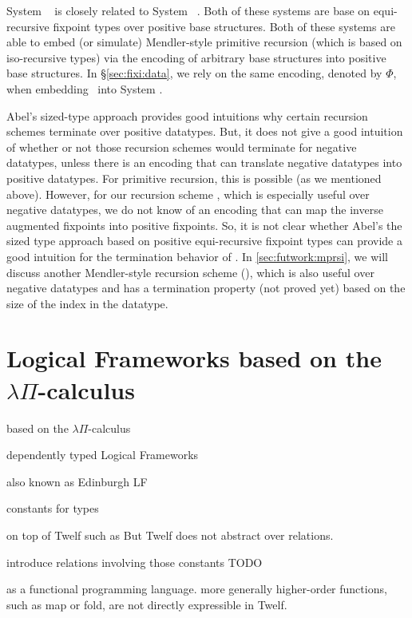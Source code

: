 System \Fwhat\ \cite{abel06phd} is closely related to
System \Fixw\ \cite{AbeMat04}. Both of these systems are base on
equi-recursive fixpoint types over positive base structures.
Both of these systems are able to embed (or simulate) Mendler-style
primitive recursion (which is based on iso-recursive types) via
the encoding \cite{Geu92} of arbitrary base structures into
positive base structures. In \S\ref{sec:fixi:data}, we rely on
the same encoding, denoted by $\Phi$, when embedding \MPr\ into System \Fixi.

Abel's sized-type approach provides good intuitions why 
certain recursion schemes terminate over positive datatypes.
But, it does not give a good intuition of whether or not
those recursion schemes would terminate for negative datatypes,
unless there is an encoding that can translate negative datatypes into
positive datatypes. For primitive recursion, this is possible (as we
mentioned above). However, for our recursion scheme \MsfIt, which is
especially useful over negative datatypes, we do not know of an encoding
that can map the inverse augmented fixpoints into positive fixpoints.
So, it is not clear whether Abel's the sized type approach based on
positive equi-recursive fixpoint types can provide a good intuition
for the termination behavior of \MsfIt.  In \ref{sec:futwork:mprsi},
we will discuss another Mendler-style recursion scheme (\mprsi), which
is also useful over negative datatypes and has a termination property
(not proved yet) based on the size of the index in the datatype.

\section{Logical Frameworks based on the $\lambda\Pi$-calculus}
\label{sec:relwork:LF}

based on the $\lambda\Pi$-calculus

dependently typed Logical Frameworks 

also known as Edinburgh LF \cite{TODO}

constants for types

on top of Twelf such as
But Twelf does not abstract over relations.

introduce relations involving those constants
TODO

as a functional programming language.
more generally higher-order functions, such as map or fold,
are not directly expressible in Twelf.

